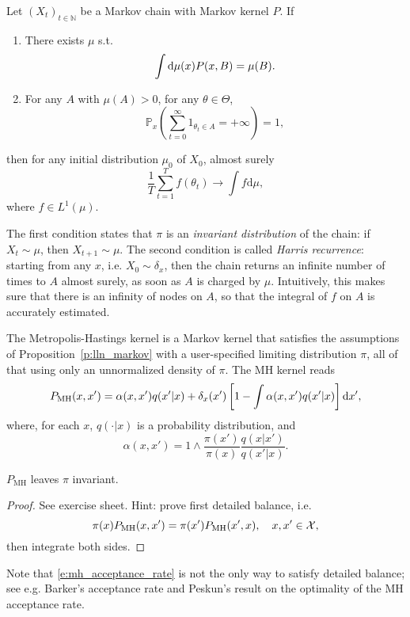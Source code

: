 \begin{proposition}
    \label{p:lln_markov}
    Let $(X_t)_{t\in\mathbb N}$ be a Markov chain with Markov kernel $P$.
    If
    \begin{enumerate}
      \item There exists $\mu$ s.t. 
      $$
      \int \mathrm{d}\mu(x) P(x, B) = \mu(B).
      $$
      \item For any $A$ with $\mu(A)>0$, for any $\theta\in \Theta$,
      $$ 
      \mathbb{P}_{x} \left(\sum_{t=0}^\infty 1_{\theta_t\in A} = +\infty\right) = 1,
      $$
    \end{enumerate}
    then for any initial distribution $\mu_0$ of $X_0$, almost surely
    $$
    \frac{1}{T} \sum_{t=1}^T f(\theta_t) \rightarrow \int f\mathrm{d}\mu,
    $$
    where $f\in L^1(\mu)$. 
\end{proposition}
The first condition states that $\pi$ is an \emph{invariant distribution} of the chain: if $X_t\sim\mu$, then $X_{t+1}\sim\mu$. 
The second condition is called \emph{Harris recurrence}: starting from any $x$, i.e. $X_0\sim\delta_{x}$, then the chain returns an infinite number of times to $A$ almost surely, as soon as $A$ is charged by $\mu$. 
Intuitively, this makes sure that there is an infinity of nodes on $A$, so that the integral of $f$ on $A$ is accurately estimated.

The Metropolis-Hastings kernel \citep{MTTR50,Has73} is a Markov kernel that satisfies the assumptions of Proposition~\ref{p:lln_markov} with a user-specified limiting distribution $\pi$, all of that using only an unnormalized density of $\pi$.
The MH kernel reads
$$
    P_{\mathrm{MH}}(x,x') = \alpha(x,x') q(x'\vert x) + \delta_x(x')\left[1-\int \alpha( x,x') q(x'\vert x)\right]\mathrm{d} x',
$$
where, for each $x$, $q(\cdot\vert x)$ is a probability distribution, and
\begin{equation}
    \label{e:mh_acceptance_rate}
    \alpha(x,x') = 1\wedge \frac{\pi(x')}{\pi(x)} \frac{q(x\vert x')}{q(x'\vert x)}.
\end{equation}
\begin{lemma}
    $P_{\mathrm{MH}}$ leaves $\pi$ invariant.
\end{lemma}
\begin{proof}
    See exercise sheet. Hint: prove first detailed balance, i.e. 
    $$ 
        \pi(x) P_{\mathrm{MH}}(x,x') = \pi(x') P_{\mathrm{MH}}(x', x), \quad x, x'\in\mathcal{X},
    $$
    then integrate both sides.
\end{proof}
Note that \eqref{e:mh_acceptance_rate} is not the only way to satisfy detailed balance; see e.g. Barker's acceptance rate and Peskun's result on the optimality of the MH acceptance rate.

